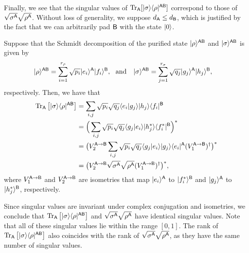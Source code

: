 Finally, we see that the singular values of $\operatorname{Tr}_{\mathsf{A}}[|\sigma\rangle\langle\rho|^{{\mathsf{A}}{\mathsf{B}}}]$ correspond to those of $\sqrt{\sigma^{\mathsf{A}}}\sqrt{\rho^{\mathsf{A}}}$.
Without loss of generality, we suppose $d_{\mathsf{A}} \leq d_{\mathsf{B}}$, which is justified by the fact that we can arbitrarily pad ${\mathsf{B}}$ with the state $|0\rangle$.

Suppose that the Schmidt decomposition of the purified state $|\rho\rangle^{{\mathsf{A}}{\mathsf{B}}}$ and $|\sigma\rangle^{{\mathsf{A}}{\mathsf{B}}}$ is given by
\begin{align}
    \label{inteq:schmidt decomp rho_sigma}
      &|\rho\rangle^{{\mathsf{A}}{\mathsf{B}}} = \sum_{i=1}^{r_\rho}\sqrt{p_i}|e_i\rangle^{\mathsf{A}}|f_i\rangle^{\mathsf{B}}, \ \ \text{and} \ \ \ |\sigma\rangle^{{\mathsf{A}}{\mathsf{B}}} = \sum_{j=1}^{r_\sigma}\sqrt{q_j}|g_j\rangle^{\mathsf{A}}|h_j\rangle^{\mathsf{B}},
\end{align}
respectively.
Then, we have that
\begin{align}
    \operatorname{Tr}_{\mathsf{A}}\big[|\sigma\rangle\langle\rho|^{{\mathsf{A}}{\mathsf{B}}}\big] 
    &= \sum_{i,j}\sqrt{p_i}\sqrt{q_j}\langle e_i \vert g_j \rangle|h_j\rangle\langle f_i|^{\mathsf{B}} \\
    &= \Big(\sum_{i,j}\sqrt{p_i}\sqrt{q_j}\langle g_j \vert e_i \rangle|h_j^*\rangle\langle f_i^*|^{\mathsf{B}}\Big)^* \\
    &= \big(V_2^{{\mathsf{A}}\rightarrow{\mathsf{B}}}\sum_{i,j}\sqrt{p_i}\sqrt{q_j}\langle g_j \vert e_i \rangle |g_j\rangle\langle e_i|^{\mathsf{A}}(V_1^{{\mathsf{A}}\rightarrow{\mathsf{B}}})^\dag\big)^* \\
    &= \big(V_2^{{\mathsf{A}}\rightarrow{\mathsf{B}}}\sqrt{\sigma^{\mathsf{A}}}\sqrt{\rho^{\mathsf{A}}}(V_1^{{\mathsf{A}}\rightarrow{\mathsf{B}}})^\dag\big)^*,
\end{align}
where $V_1^{{\mathsf{A}}\rightarrow{\mathsf{B}}}$ and $V_2^{{\mathsf{A}}\rightarrow{\mathsf{B}}}$ are isometries that map $|e_i\rangle^{\mathsf{A}}$ to $|f_i^*\rangle^{\mathsf{B}}$ and $|g_j\rangle^{\mathsf{A}}$ to $|h_j^*\rangle^{\mathsf{B}}$, respectively.


Since singular values are invariant under complex conjugation and isometries, we conclude that $\operatorname{Tr}_{\mathsf{A}}\big[|\sigma\rangle\langle\rho|^{{\mathsf{A}}{\mathsf{B}}}\big]$ and $\sqrt{\sigma^{\mathsf{A}}}\sqrt{\rho^{\mathsf{A}}}$ have identical singular values.
Note that all of these singular values lie within the range $[0,1]$.
The rank of $\operatorname{Tr}_{{\mathsf{A}}}\big[|\sigma\rangle\langle\rho|^{{\mathsf{A}}{\mathsf{B}}}\big]$ also coincides with the rank of $\sqrt{\sigma^{\mathsf{A}}}\sqrt{\rho^{\mathsf{A}}}$, as they have the same number of singular values.


















